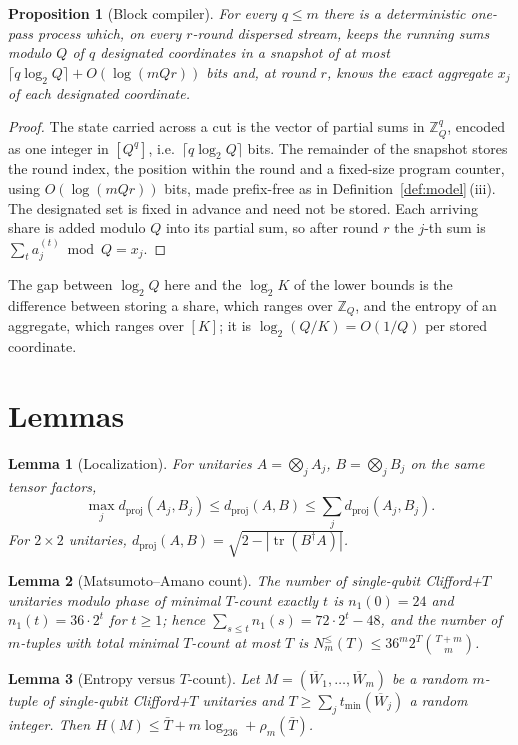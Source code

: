 \documentclass[aps,prx,twocolumn,superscriptaddress,nofootinbib,longbibliography]{revtex4-2}
\theoremstyle{plain}
\newtheorem{lemma}{Lemma}
\newtheorem{proposition}{Proposition}
\theoremstyle{definition}
\theoremstyle{remark}
\newcommand{\dproj}{d_{\mathrm{proj}}}
\newcommand{\Z}{\mathbb{Z}}
\newcommand{\tr}{\operatorname{tr}}
\begin{document}
\begin{proposition}[Block compiler]\label{prop:block}
For every $q\le m$ there is a deterministic one-pass process which, on every $r$-round dispersed stream, keeps the running sums modulo $Q$ of $q$ designated coordinates in a snapshot of at most $\lceil q\log_2Q\rceil+O(\log(mQr))$ bits and, at round $r$, knows the exact aggregate $x_j$ of each designated coordinate.
\end{proposition}
\begin{proof}
The state carried across a cut is the vector of partial sums in $\Z_Q^q$, encoded as one integer in $[Q^q]$, i.e.\ $\lceil q\log_2Q\rceil$ bits. The remainder of the snapshot stores the round index, the position within the round and a fixed-size program counter, using $O(\log(mQr))$ bits, made prefix-free as in Definition~\ref{def:model}\,(iii). The designated set is fixed in advance and need not be stored. Each arriving share is added modulo $Q$ into its partial sum, so after round $r$ the $j$-th sum is $\sum_ta^{(t)}_j\bmod Q=x_j$.
\end{proof}
The gap between $\log_2Q$ here and the $\log_2K$ of the lower bounds is the difference between storing a share, which ranges over $\Z_Q$, and the entropy of an aggregate, which ranges over $[K]$; it is $\log_2(Q/K)=O(1/Q)$ per stored coordinate.

\section{Lemmas}\label{app:lemmas}


\begin{lemma}[Localization]\label{lem:loc}
For unitaries $A=\bigotimes_jA_j$, $B=\bigotimes_jB_j$ on the same tensor factors,
\[\max_j\dproj(A_j,B_j)\le\dproj(A,B)\le\sum_j\dproj(A_j,B_j).\]
For $2\times2$ unitaries, $\dproj(A,B)=\sqrt{2-|\tr(B^\dagger A)|}$.
\end{lemma}

\begin{lemma}[Matsumoto--Amano count]\label{lem:MA}
The number of single-qubit Clifford+$T$ unitaries modulo phase of minimal $T$-count exactly $t$ is $n_1(0)=24$ and $n_1(t)=36\cdot2^t$ for $t\ge1$; hence $\sum_{s\le t}n_1(s)=72\cdot2^t-48$, and the number of $m$-tuples with total minimal $T$-count at most $T$ is $N^{\le}_m(T)\le36^m2^T\binom{T+m}{m}$.
\end{lemma}

\begin{lemma}[Entropy versus $T$-count]\label{lem:ent}
Let $M=(\overline W_1,\allowbreak\dots,\allowbreak\overline W_m)$ be a random $m$-tuple of single-qubit Clifford+$T$ unitaries and $T\ge\sum_jt_{\min}(\overline W_j)$ a random integer. Then $H(M)\le\bar T+m\log_236+\rho_m(\bar T)$.
\end{lemma}
\end{document}

